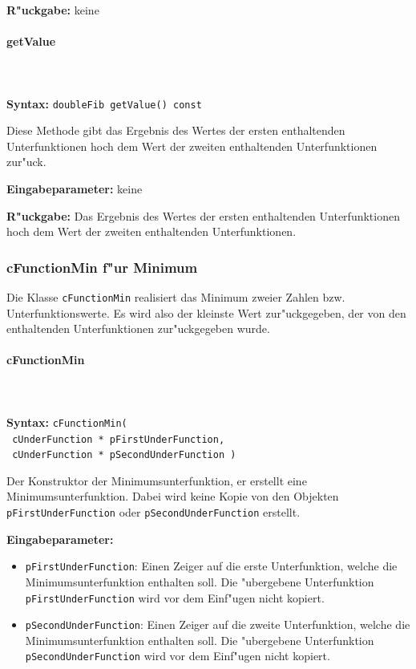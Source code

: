 \bigskip\noindent
\textbf{R"uckgabe:} keine


\paragraph{getValue}

\ \\\\\noindent
\textbf{Syntax:} \verb|doubleFib getValue() const|

\bigskip\noindent
Diese Methode gibt das Ergebnis des Wertes der ersten enthaltenden Unterfunktionen hoch dem Wert der zweiten enthaltenden Unterfunktionen zur"uck.

\bigskip\noindent
\textbf{Eingabeparameter:} keine

\bigskip\noindent
\textbf{R"uckgabe:} Das Ergebnis des Wertes der ersten enthaltenden Unterfunktionen hoch dem Wert der zweiten enthaltenden Unterfunktionen.


\subsubsection{cFunctionMin f"ur Minimum}

Die Klasse \verb|cFunctionMin| realisiert das Minimum zweier Zahlen bzw. Unterfunktionswerte. Es wird also der kleinste Wert zur"uckgegeben, der von den enthaltenden Unterfunktionen zur"uckgegeben wurde.

\paragraph{cFunctionMin}

\ \\\\\noindent
\textbf{Syntax:} \verb|cFunctionMin(| \\\verb| cUnderFunction * pFirstUnderFunction,| \\\verb| cUnderFunction * pSecondUnderFunction )|

\bigskip\noindent
Der Konstruktor der Minimumsunterfunktion, er erstellt eine Minimumsunterfunktion. Dabei wird keine Kopie von den Objekten \verb|pFirstUnderFunction| oder \verb|pSecondUnderFunction| erstellt.

\bigskip\noindent
\textbf{Eingabeparameter:}
\begin{itemize}
 \item \verb|pFirstUnderFunction|: Einen Zeiger auf die erste Unterfunktion, welche die Minimumsunterfunktion enthalten soll. Die "ubergebene Unterfunktion \verb|pFirstUnderFunction| wird vor dem Einf"ugen nicht kopiert.
 \item \verb|pSecondUnderFunction|: Einen Zeiger auf die zweite Unterfunktion, welche die Minimumsunterfunktion enthalten soll. Die "ubergebene Unterfunktion \verb|pSecondUnderFunction| wird vor dem Einf"ugen nicht kopiert.
\end{itemize}

